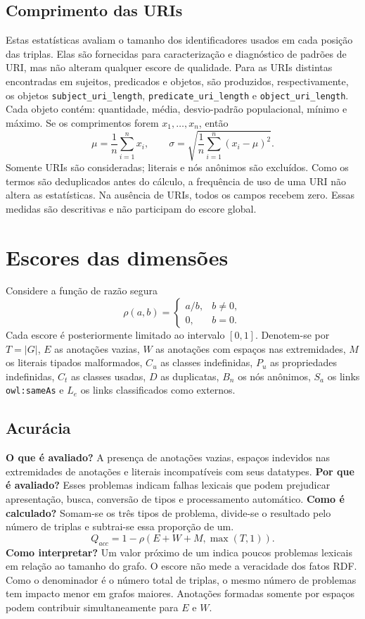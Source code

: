 \documentclass[12pt,a4paper]{article}
\newcommand{\metrica}[1]{\texttt{#1}}
\newcommand{\card}[1]{\left\lvert #1\right\rvert}
\begin{document}
\subsection{Comprimento das URIs}
Estas estatísticas avaliam o tamanho dos identificadores usados em cada posição das triplas. Elas são fornecidas para caracterização e diagnóstico de padrões de URI, mas não alteram qualquer escore de qualidade.
Para as URIs distintas encontradas em sujeitos, predicados e objetos, são produzidos, respectivamente, os objetos \metrica{subject\_uri\_length}, \metrica{predicate\_uri\_length} e \metrica{object\_uri\_length}. Cada objeto contém: quantidade, média, desvio-padrão populacional, mínimo e máximo. Se os comprimentos forem \(x_1,\ldots,x_n\), então
\[
\mu=\frac{1}{n}\sum_{i=1}^{n}x_i, \qquad \sigma=\sqrt{\frac{1}{n}\sum_{i=1}^{n}(x_i-\mu)^2}.
\]
Somente URIs são consideradas; literais e nós anônimos são excluídos. Como os termos são deduplicados antes do cálculo, a frequência de uso de uma URI não altera as estatísticas. Na ausência de URIs, todos os campos recebem zero. Essas medidas são descritivas e não participam do escore global.
\section{Escores das dimensões}
Considere a função de razão segura
\[
\rho(a,b)= \begin{cases} a/b, & b\neq 0,\\ 0,   & b=0. \end{cases}
\]
Cada escore é posteriormente limitado ao intervalo \([0,1]\). Denotem-se por \(T=\card{G}\), \(E\) as anotações vazias, \(W\) as anotações com espaços nas extremidades, \(M\) os literais tipados malformados, \(C_u\) as classes indefinidas, \(P_u\) as propriedades indefinidas, \(C_t\) as classes usadas, \(D\) as duplicatas, \(B_n\) os nós anônimos, \(S_a\) os links \texttt{owl:sameAs} e \(L_e\) os links classificados como externos.
\subsection{Acurácia}
\noindent\textbf{O que é avaliado?} A presença de anotações vazias, espaços indevidos nas extremidades de anotações e literais incompatíveis com seus datatypes. \textbf{Por que é avaliado?} Esses problemas indicam falhas lexicais que podem prejudicar apresentação, busca, conversão de tipos e processamento automático. \textbf{Como é calculado?} Somam-se os três tipos de problema, divide-se o resultado pelo número de triplas e subtrai-se essa proporção de um.
\[
Q_{acc}=1-\rho(E+W+M,\max(T,1)).
\]
\noindent\textbf{Como interpretar?} Um valor próximo de um indica poucos problemas lexicais em relação ao tamanho do grafo. O escore não mede a veracidade dos fatos RDF. Como o denominador é o número total de triplas, o mesmo número de problemas tem impacto menor em grafos maiores. Anotações formadas somente por espaços podem contribuir simultaneamente para \(E\) e \(W\).
\end{document}
